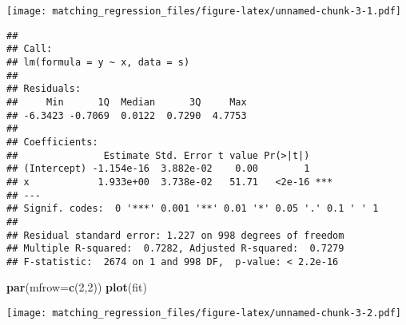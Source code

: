 \documentclass[
]{article}
\newenvironment{Shaded}{\begin{snugshade}}{\end{snugshade}}
\newcommand{\DataTypeTok}[1]{\textcolor[rgb]{0.13,0.29,0.53}{#1}}
\newcommand{\DecValTok}[1]{\textcolor[rgb]{0.00,0.00,0.81}{#1}}
\newcommand{\KeywordTok}[1]{\textcolor[rgb]{0.13,0.29,0.53}{\textbf{#1}}}
\newcommand{\NormalTok}[1]{#1}
\newcommand{\OperatorTok}[1]{\textcolor[rgb]{0.81,0.36,0.00}{\textbf{#1}}}
\newcommand{\StringTok}[1]{\textcolor[rgb]{0.31,0.60,0.02}{#1}}
\begin{document}
\begin{Shaded}
\end{Shaded}

\texttt{[image: matching\_regression\_files/figure-latex/unnamed-chunk-3-1.pdf]}

\begin{Shaded}
\end{Shaded}

\begin{verbatim}
## 
## Call:
## lm(formula = y ~ x, data = s)
## 
## Residuals:
##     Min      1Q  Median      3Q     Max 
## -6.3423 -0.7069  0.0122  0.7290  4.7753 
## 
## Coefficients:
##               Estimate Std. Error t value Pr(>|t|)    
## (Intercept) -1.154e-16  3.882e-02    0.00        1    
## x            1.933e+00  3.738e-02   51.71   <2e-16 ***
## ---
## Signif. codes:  0 '***' 0.001 '**' 0.01 '*' 0.05 '.' 0.1 ' ' 1
## 
## Residual standard error: 1.227 on 998 degrees of freedom
## Multiple R-squared:  0.7282, Adjusted R-squared:  0.7279 
## F-statistic:  2674 on 1 and 998 DF,  p-value: < 2.2e-16
\end{verbatim}

\begin{Shaded}
\begin{Highlighting}[]
\KeywordTok{par}\NormalTok{(}\DataTypeTok{mfrow=}\KeywordTok{c}\NormalTok{(}\DecValTok{2}\NormalTok{,}\DecValTok{2}\NormalTok{))}
\KeywordTok{plot}\NormalTok{(fit)}
\end{Highlighting}
\end{Shaded}

\texttt{[image: matching\_regression\_files/figure-latex/unnamed-chunk-3-2.pdf]}
\end{document}
